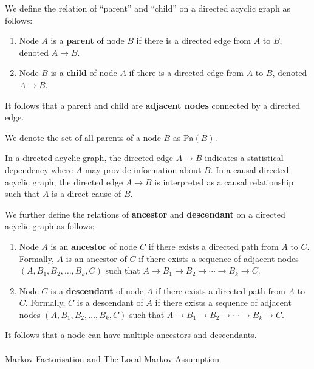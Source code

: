 \documentclass[
  single column]{article}
\makeatletter
\let\oldparagraph\paragraph
\renewcommand{\paragraph}{
    \@ifstar
      \xxxParagraphStar
      \xxxParagraphNoStar
  }
\newcommand{\xxxParagraphStar}[1]{\oldparagraph*{#1}\mbox{}}
\newcommand{\xxxParagraphNoStar}[1]{\oldparagraph{#1}\mbox{}}
\providecommand{\tightlist}{%
  \setlength{\itemsep}{0pt}\setlength{\parskip}{0pt}}\usepackage{longtable,booktabs,array}
\makeatother
\begin{document}
We define the relation of ``parent'' and ``child'' on a directed acyclic
graph as follows:

\begin{enumerate}
\def\labelenumi{\arabic{enumi}.}
\tightlist
\item
  Node \(A\) is a \textbf{parent} of node \(B\) if there is a directed
  edge from \(A\) to \(B\), denoted \(A \rightarrow B\).
\item
  Node \(B\) is a \textbf{child} of node \(A\) if there is a directed
  edge from \(A\) to \(B\), denoted \(A \rightarrow B\).
\end{enumerate}

It follows that a parent and child are \textbf{adjacent nodes} connected
by a directed edge.

We denote the set of all parents of a node \(B\) as \(\text{Pa}(B)\).

In a directed acyclic graph, the directed edge \(A \rightarrow B\)
indicates a statistical dependency where \(A\) may provide information
about \(B\). In a causal directed acyclic graph, the directed edge
\(A \rightarrow B\) is interpreted as a causal relationship such that
\(A\) is a direct cause of \(B\).

We further define the relations of \textbf{ancestor} and
\textbf{descendant} on a directed acyclic graph as follows:

\begin{enumerate}
\def\labelenumi{\arabic{enumi}.}
\tightlist
\item
  Node \(A\) is an \textbf{ancestor} of node \(C\) if there exists a
  directed path from \(A\) to \(C\). Formally, \(A\) is an ancestor of
  \(C\) if there exists a sequence of adjacent nodes
  \((A, B_1, B_2, \ldots, B_k, C)\) such that
  \(A \rightarrow B_1 \rightarrow B_2 \rightarrow \cdots \rightarrow B_k \rightarrow C\).
\item
  Node \(C\) is a \textbf{descendant} of node \(A\) if there exists a
  directed path from \(A\) to \(C\). Formally, \(C\) is a descendant of
  \(A\) if there exists a sequence of adjacent nodes
  \((A, B_1, B_2, \ldots, B_k, C)\) such that
  \(A \rightarrow B_1 \rightarrow B_2 \rightarrow \cdots \rightarrow B_k \rightarrow C\).
\end{enumerate}

It follows that a node can have multiple ancestors and descendants.

\paragraph{Markov Factorisation and The Local Markov
Assumption}\label{markov-factorisation-and-the-local-markov-assumption}
\end{document}

